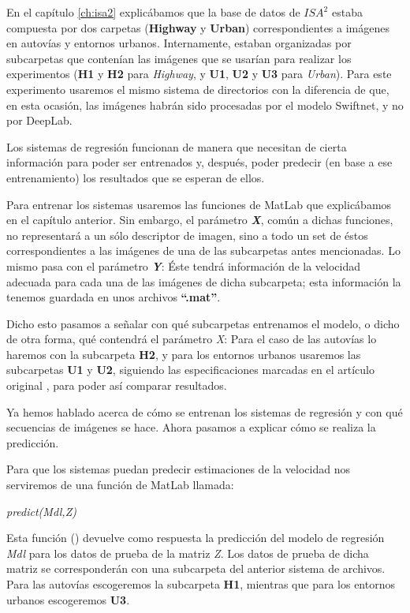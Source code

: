 En el capítulo \ref{ch:isa2} explicábamos que la base de datos de $ISA^{2}$ estaba compuesta por dos carpetas (\textbf{Highway} y \textbf{Urban}) correspondientes a imágenes en autovías y entornos urbanos. Internamente, estaban organizadas por subcarpetas que contenían las imágenes que se usarían para realizar los experimentos (\textbf{H1} y \textbf{H2} para \textit{Highway}, y \textbf{U1}, \textbf{U2} y \textbf{U3} para \textit{Urban}). Para este experimento usaremos el mismo sistema de directorios con la diferencia de que, en esta ocasión, las imágenes habrán sido procesadas por el modelo Swiftnet, y no por DeepLab.

Los sistemas de regresión funcionan de manera que necesitan de cierta información para poder ser entrenados y, después, poder predecir (en base a ese entrenamiento) los resultados que se esperan de ellos.

Para entrenar los sistemas usaremos las funciones de MatLab que explicábamos en el capítulo anterior. Sin embargo, el parámetro \textbf{\textit{X}}, común a dichas funciones, no representará a un sólo descriptor de imagen, sino a todo un set de éstos correspondientes a las imágenes de una de las subcarpetas antes mencionadas. Lo mismo pasa con el parámetro \textbf{\textit{Y}}: Éste tendrá información de la velocidad adecuada para cada una de las imágenes de dicha subcarpeta; esta información la tenemos guardada en unos archivos \textbf{``.mat''}.

Dicho esto pasamos a señalar con qué subcarpetas entrenamos el modelo, o dicho de otra forma, qué contendrá el parámetro \textit{X}: Para el caso de las autovías lo haremos con la subcarpeta \textbf{H2}, y para los entornos urbanos usaremos las subcarpetas \textbf{U1} y \textbf{U2}, siguiendo las especificaciones marcadas en el artículo original \cite{isa2}, para poder así comparar resultados.

Ya hemos hablado acerca de cómo se entrenan los sistemas de regresión y con qué secuencias de imágenes se hace. Ahora pasamos a explicar cómo se realiza la predicción.

Para que los sistemas puedan predecir estimaciones de la velocidad nos serviremos de una función de MatLab llamada:

\begin{center}
\textit{predict(Mdl,Z)}
\end{center}

Esta función (\cite{predict}) devuelve como respuesta la predicción del modelo de regresión \textit{Mdl} para los datos de prueba de la matriz \textit{Z}. Los datos de prueba de dicha matriz se corresponderán con una subcarpeta del anterior sistema de archivos. Para las autovías escogeremos la subcarpeta \textbf{H1}, mientras que para los entornos urbanos escogeremos \textbf{U3}.

